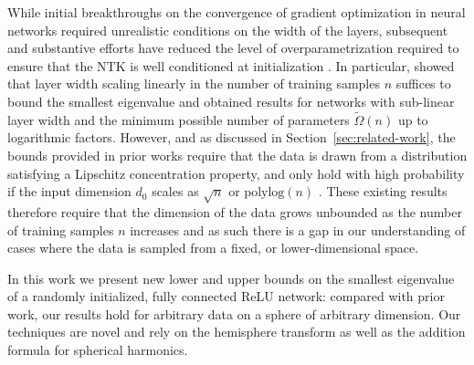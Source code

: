 \documentclass{article}
\theoremstyle{definition}
\begin{document}
While initial breakthroughs on the convergence of gradient optimization in neural networks \citep{NEURIPS2018_54fe976b, du2019gradient,
allenzhu2019convergence} 
required unrealistic conditions on the width of the layers, 
subsequent and substantive efforts have reduced the level of overparametrization required to ensure that the NTK is well conditioned at initialization \citep{zou2019improved,
Oymak2019TowardMO}. 
In particular, \citet{nguyenrelu,nguyen2021tight,banerjee2023neural}
showed that layer width scaling linearly in the number of training samples $n$ suffices to bound the smallest eigenvalue 
and \cite{montanari2022interpolation, bombari2022memorization} obtained results for networks with sub-linear layer width and the minimum possible number of parameters $\tilde{\Omega}(n)$ up to logarithmic factors. 
However, and as discussed in Section~\ref{sec:related-work}, the bounds provided in prior works require that the data is drawn from a distribution satisfying a Lipschitz concentration property, and only hold with high probability if the input dimension $d_0$ scales as $\sqrt{n}$ \citep{bombari2022memorization} or $\text{polylog}(n)$ \citep{nguyen2021tight}. These existing results therefore require that the dimension of the data grows unbounded as the number of training samples $n$ increases and as such there is a gap in our understanding of cases where the data is sampled from a fixed, or lower-dimensional space. 

In this work we present new lower and upper bounds on the smallest eigenvalue of a randomly initialized, fully connected ReLU network: 
compared with prior work, our results hold for arbitrary data on a sphere of arbitrary dimension. 
Our techniques are novel and rely on the hemisphere transform as well as the addition formula for spherical harmonics. 
\end{document}
